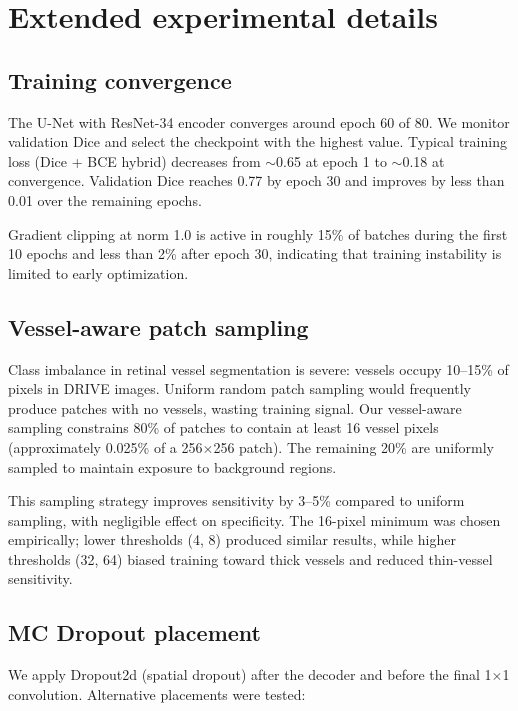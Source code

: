 \section{Extended experimental details}
\label{app:details}

\subsection{Training convergence}

The U-Net with ResNet-34 encoder converges around epoch 60 of 80. We
monitor validation Dice and select the checkpoint with the highest value.
Typical training loss (Dice + BCE hybrid) decreases from $\sim$0.65 at
epoch 1 to $\sim$0.18 at convergence. Validation Dice reaches 0.77 by
epoch 30 and improves by less than 0.01 over the remaining epochs.

Gradient clipping at norm 1.0 is active in roughly 15\% of batches during
the first 10 epochs and less than 2\% after epoch 30, indicating that
training instability is limited to early optimization.

\subsection{Vessel-aware patch sampling}

Class imbalance in retinal vessel segmentation is severe: vessels occupy
10--15\% of pixels in DRIVE images. Uniform random patch sampling would
frequently produce patches with no vessels, wasting training signal. Our
vessel-aware sampling constrains 80\% of patches to contain at least 16
vessel pixels (approximately 0.025\% of a 256$\times$256 patch). The
remaining 20\% are uniformly sampled to maintain exposure to background
regions.

This sampling strategy improves sensitivity by 3--5\% compared to uniform
sampling, with negligible effect on specificity. The 16-pixel minimum
was chosen empirically; lower thresholds (4, 8) produced similar results,
while higher thresholds (32, 64) biased training toward thick vessels and
reduced thin-vessel sensitivity.

\subsection{MC Dropout placement}

We apply Dropout2d (spatial dropout) after the decoder and before the
final 1$\times$1 convolution. Alternative placements were tested:

